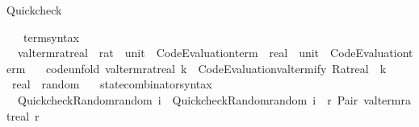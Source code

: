 \begin{isabellebody}
\endisatagproof
{\isafoldproof}%
%
\isadelimproof
%
\endisadelimproof
%
\begin{isamarkuptext}%
Quickcheck%
\end{isamarkuptext}\isamarkuptrue%
\isamarkupfalse%
\isanewline
\ \ \ term{\isacharunderscore}{\kern0pt}syntax\isanewline
{}\isanewline
\isanewline
{}\isamarkupfalse%
\isanewline
\ \ valterm{\isacharunderscore}{\kern0pt}ratreal\ {\isacharcolon}{\kern0pt}{\isacharcolon}{\kern0pt}\ {\isachardoublequoteopen}rat\ {\isasymtimes}\ {\isacharparenleft}{\kern0pt}unit\ {\isasymRightarrow}\ Code{\isacharunderscore}{\kern0pt}Evaluation{\isachardot}{\kern0pt}term{\isacharparenright}{\kern0pt}\ {\isasymRightarrow}\ real\ {\isasymtimes}\ {\isacharparenleft}{\kern0pt}unit\ {\isasymRightarrow}\ Code{\isacharunderscore}{\kern0pt}Evaluation{\isachardot}{\kern0pt}term{\isacharparenright}{\kern0pt}{\isachardoublequoteclose}\isanewline
\ \ \ {\isacharbrackleft}{\kern0pt}code{\isacharunderscore}{\kern0pt}unfold{\isacharbrackright}{\kern0pt}{\isacharcolon}{\kern0pt}\ {\isachardoublequoteopen}valterm{\isacharunderscore}{\kern0pt}ratreal\ k\ {\isacharequal}{\kern0pt}\ Code{\isacharunderscore}{\kern0pt}Evaluation{\isachardot}{\kern0pt}valtermify\ Ratreal\ {\isacharbraceleft}{\kern0pt}{\isasymcdot}{\isacharbraceright}{\kern0pt}\ k{\isachardoublequoteclose}\isanewline
\isanewline
{}\isamarkupfalse%
\isanewline
\isanewline
{}\isamarkupfalse%
\ real\ {\isacharcolon}{\kern0pt}{\isacharcolon}{\kern0pt}\ random\isanewline
{}\isanewline
\isanewline
{}\isamarkupfalse%
\isanewline
\ \ \ state{\isacharunderscore}{\kern0pt}combinator{\isacharunderscore}{\kern0pt}syntax\isanewline
{}\isanewline
\isanewline
{}\isamarkupfalse%
\isanewline
\ \ {\isachardoublequoteopen}Quickcheck{\isacharunderscore}{\kern0pt}Random{\isachardot}{\kern0pt}random\ i\ {\isacharequal}{\kern0pt}\ Quickcheck{\isacharunderscore}{\kern0pt}Random{\isachardot}{\kern0pt}random\ i\ {\isasymcirc}{\isasymrightarrow}\ {\isacharparenleft}{\kern0pt}{\isasymlambda}r{\isachardot}{\kern0pt}\ Pair\ {\isacharparenleft}{\kern0pt}valterm{\isacharunderscore}{\kern0pt}ratreal\ r{\isacharparenright}{\kern0pt}{\isacharparenright}{\kern0pt}{\isachardoublequoteclose}\isanewline
\isanewline
{}\isamarkupfalse%
%
\isadelimproof
\ %
\endisadelimproof
%
\isatagproof
\isacommand{{\isachardot}{\kern0pt}{\isachardot}{\kern0pt}}\isamarkupfalse%

\end{isabellebody}
